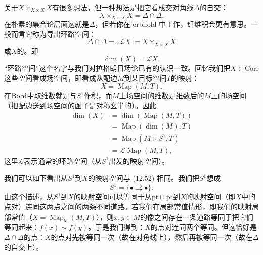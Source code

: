 关于$X\times_{X\times X}X$有很多想法，但一种想法是把它看成交对角线$\Delta$的自交：
\begin{equation}\tag{12.51}
X\times_{X\times X}X=\Delta\cap\Delta.
\end{equation}
在朴素的集合论层面这就是$\Delta$，但若你在 orbifold 中工作，纤维积会更有意思。一般而言它称为导出环路空间：
\begin{equation}\tag{12.52}
\Delta\cap\Delta=:\mathcal{L}X:=X\times_{X\times X}X
\end{equation}
或$X$的。即
\begin{equation}\tag{12.53}
\dim(X)=\mathcal{L}X.
\end{equation}
“环路空间”这个名字与我们对拉格朗日场论已有的认识一致。回忆我们把$X\in\mathrm{Corr}$这些空间看成场空间，即看成从配边$M$到某目标空间$T$的映射：
\begin{equation}\tag{12.54}
X=\operatorname{Map}(M,T).
\end{equation}
在$\mathrm{Bord}$中取维数就是与$S^{1}$作积，而$M$上场空间的维数是维数后的$M$上的场空间（把配边送到场空间的函子是对称幺半的）。因此
\begin{align}
\dim(X)&=\dim(\operatorname{Map}(M,T))\tag{12.55}\\
&=\operatorname{Map}(\dim(M),T)\tag{12.56}\\
&=\operatorname{Map}(M\times S^{1},T)\tag{12.57}\\
&=\mathcal{L}\operatorname{Map}(M,T),\tag{12.58}
\end{align}
这里$\mathcal{L}$表示通常的环路空间（从$S^{1}$出发的映射空间）。

我们可以如下看出从$S^{1}$到$X$的映射空间与 (12.52) 相同。我们把$S^{1}$想成
\begin{equation}\tag{12.59}
S^{1}=\{\bullet\rightrightarrows\bullet\}.
\end{equation}
由这个描述，从$S^{1}$到$X$的映射空间可以等同于从$\mathrm{pt}\sqcup\mathrm{pt}$到$X$的映射空间（即$X$中的点对）连同这两点之间的两条不同道路。若我们在局部常值情形，即我们的映射局部常值（$X=\operatorname{Map}_{lc}(M,T)$），则$x,y\in M$的像之间存在一条道路等同于把它们等同起来：$f(x)\sim f(y)$。于是我们得到：$X$的点对连同两个等同。但这恰好是$\Delta\cap\Delta$的点：$X$的点对先被等同一次（故在对角线上），然后再被等同一次（故在$\Delta$的自交上）。

